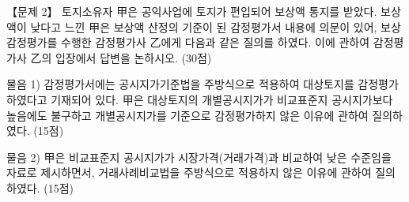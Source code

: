 \begin{longquestion}{【문제 2】}
토지소유자 甲은 공익사업에 토지가 편입되어 보상액 통지를 받았다. 보상액이 낮다고 느낀 甲은 보상액 산정의 기준이 된 감정평가서 내용에 의문이 있어, 보상감정평가를 수행한 감정평가사 乙에게 다음과 같은 질의를 하였다. 이에 관하여 감정평가사 乙의 입장에서 답변을 논하시오. (30점) \par
\medskip\noindent 물음 1) 감정평가서에는 공시지가기준법을 주방식으로 적용하여 대상토지를 감정평가하였다고 기재되어 있다. 甲은 대상토지의 개별공시지가가 비교표준지 공시지가보다 높음에도 불구하고 개별공시지가를 기준으로 감정평가하지 않은 이유에 관하여 질의하였다. (15점) \par
\medskip\noindent 물음 2) 甲은 비교표준지 공시지가가 시장가격(거래가격)과 비교하여 낮은 수준임을 자료로 제시하면서, 거래사례비교법을 주방식으로 적용하지 않은 이유에 관하여 질의하였다. (15점) \par
\end{longquestion}

